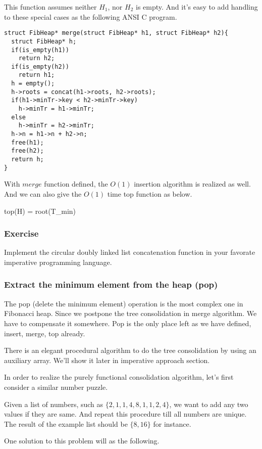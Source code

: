 \documentclass{article}
\begin{document}
This function assumes neither $H_1$, nor $H_2$ is empty. And it's easy
to add handling to these special cases as the following ANSI C program.

\lstset{language=C}
\begin{lstlisting}
struct FibHeap* merge(struct FibHeap* h1, struct FibHeap* h2){
  struct FibHeap* h;
  if(is_empty(h1))
    return h2;
  if(is_empty(h2))
    return h1;
  h = empty();
  h->roots = concat(h1->roots, h2->roots);
  if(h1->minTr->key < h2->minTr->key)
    h->minTr = h1->minTr;
  else
    h->minTr = h2->minTr;
  h->n = h1->n + h2->n;
  free(h1);
  free(h2);
  return h;
}
\end{lstlisting}

With $merge$ function defined, the $O(1)$ insertion algorithm is realized
as well. And we can also give the $O(1)$ time top function as below.

\be
top(H) = root(T_{min})
\ee

\subsubsection*{Exercise}
Implement the circular doubly linked list concatenation function in
your favorate imperative programming language.

\subsubsection{Extract the minimum element from the heap (pop)}

The pop (delete the minimum element) operation is the most complex
one in Fibonacci heap. Since we postpone the tree consolidation
in merge algorithm. We have to compensate it somewhere. Pop is 
the only place left as we have defined, insert, merge, top already.

There is an elegant procedural algorithm to do the tree consolidation
by using an auxiliary array\cite{CLRS}. We'll show it later in imperative
approach section.

In order to realize the purely functional consolidation algorithm, 
let's first consider a similar number puzzle.

Given a list of numbers, such as $\{2, 1, 1, 4, 8, 1, 1, 2, 4\}$, we want
to add any two values if they are same. And repeat this procedure till 
all numbers are unique. The result of the example list should be 
$\{8, 16\}$ for instance.

One solution to this problem will as the following.
\end{document}
